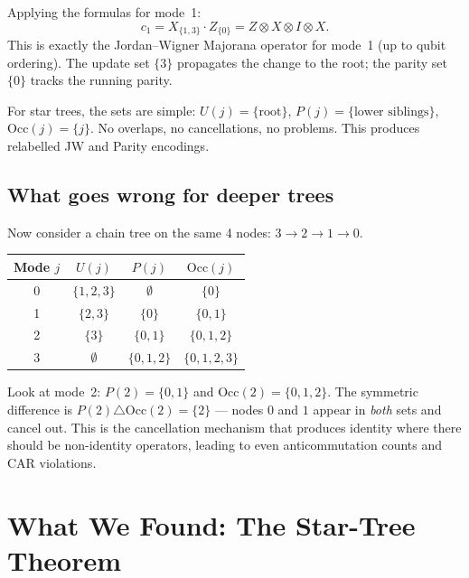 \documentclass[11pt,a4paper]{article}
\newcommand{\Occ}[1]{\mathrm{Occ}(#1)}
\theoremstyle{definition}
\begin{document}
Applying the formulas for mode~1:
\[
  c_1 = X_{\{1,3\}} \cdot Z_{\{0\}}
      = Z \otimes X \otimes I \otimes X.
\]
This is exactly the Jordan--Wigner Majorana operator for mode~1
(up to qubit ordering).  The update set $\{3\}$ propagates the change
to the root; the parity set $\{0\}$ tracks the running parity.

\begin{keyinsight}
For star trees, the sets are simple: $U(j) = \{\text{root}\}$,
$P(j) = \{\text{lower siblings}\}$, $\Occ{j} = \{j\}$.  No overlaps,
no cancellations, no problems.  This produces relabelled JW and
Parity encodings.
\end{keyinsight}

\subsection{What goes wrong for deeper trees}

Now consider a chain tree on the same 4 nodes: $3 \to 2 \to 1 \to 0$.

\begin{center}
\begin{tabular}{@{}cccc@{}}
\toprule
Mode $j$ & $U(j)$ & $P(j)$ & $\Occ{j}$ \\
\midrule
0 & $\{1, 2, 3\}$ & $\emptyset$ & $\{0\}$ \\
1 & $\{2, 3\}$ & $\{0\}$ & $\{0, 1\}$ \\
2 & $\{3\}$ & $\{0, 1\}$ & $\{0, 1, 2\}$ \\
3 & $\emptyset$ & $\{0, 1, 2\}$ & $\{0, 1, 2, 3\}$ \\
\bottomrule
\end{tabular}
\end{center}

Look at mode~2: $P(2) = \{0, 1\}$ and $\Occ{2} = \{0, 1, 2\}$.  The
symmetric difference is $P(2) \triangle \Occ{2} = \{2\}$ --- nodes
$0$ and $1$ appear in \emph{both} sets and cancel out.  This is the
cancellation mechanism that produces identity where there should be
non-identity operators, leading to even anticommutation counts and
CAR violations.

\section{What We Found: The Star-Tree Theorem}
\label{sec:theorem}
\end{document}

